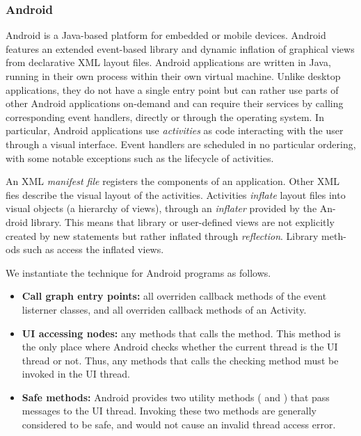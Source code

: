 
\subsubsection{Android}

Android is a Java-based platform for embedded or mobile devices. 
Android features an extended event-based library and dynamic inflation of
graphical views from declarative XML layout files. Android applications are
written in Java, running in their own process within their own virtual machine.
Unlike desktop applications, they do not have a single entry point but can
rather use parts of other Android applications on-demand and can require their
services by calling corresponding event handlers, directly or through the
operating system. In particular, Android applications use \textit{activities}
as code interacting with the user through a visual interface. Event handlers
are scheduled in no particular ordering, with some notable exceptions such as the
lifecycle of activities.

An XML \textit{manifest file} registers the components of an application. Other XML
fies describe the visual layout of the activities. Activities \textit{inflate}
layout files into
visual objects (a hierarchy of views), through an \textit{inflater} provided by the An-
droid library. This means that library or user-defined views are not explicitly
created by new statements but rather inflated through \textit{reflection}. Library meth-
ods such as  access the inflated views.

We instantiate the technique for Android programs as follows.

\begin{itemize}

\item \textbf{Call graph entry points: } all overriden callback methods of the event
listerner classes, and all overriden callback methods of an Activity. 

\item \textbf{UI accessing nodes: } any methods that calls the 
method. This method is the only place where Android checks
whether the current thread is the UI thread or not. Thus, any
methods that calls the checking method must be invoked in the UI thread.

\item \textbf{Safe methods: } Android provides two utility methods (
and ) that pass messages to the UI thread.
 Invoking these two methods are generally considered to be safe, and would not
cause an invalid thread access error.

\end{itemize}
